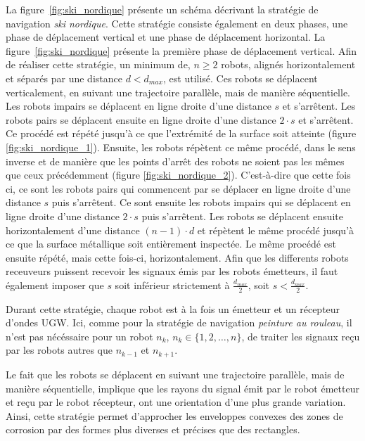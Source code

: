 \documentclass[francais,RandD]{rapportPFE}
\begin{document}
				La figure~\ref{fig:ski_nordique} présente un schéma décrivant la stratégie de navigation \textit{ski nordique}.
				Cette stratégie consiste également en deux phases, une phase de déplacement vertical et une phase de déplacement horizontal.
				La figure~\ref{fig:ski_nordique} présente la première phase de déplacement vertical.
				Afin de réaliser cette stratégie, un minimum de, $n \ge 2$ robots, alignés horizontalement et séparés par une distance $d < d_{max}$, est utilisé.
				Ces robots se déplacent verticalement, en suivant une trajectoire parallèle, mais de manière séquentielle.
				Les robots impairs se déplacent en ligne droite d'une distance $s$ et s'arrêtent.
				Les robots pairs se déplacent ensuite en ligne droite d'une distance $2 \cdot s$ et s'arrêtent.
				Ce procédé est répété jusqu'à ce que l'extrémité de la surface soit atteinte (figure \ref{fig:ski_nordique_1}).
				Ensuite, les robots répètent ce même procédé, dans le sens inverse et de manière que les points d'arrêt des robots ne soient pas les mêmes que ceux précédemment (figure \ref{fig:ski_nordique_2}).
				C'est-à-dire que cette fois ci, ce sont les robots pairs qui commencent par se déplacer en ligne droite d'une distance $s$ puis s'arrêtent.
				Ce sont ensuite les robots impairs qui se déplacent en ligne droite d'une distance $2 \cdot s$ puis s'arrêtent.
				Les robots se déplacent ensuite horizontalement d'une distance $(n - 1) \cdot d$ et répètent le même procédé jusqu'à ce que la surface métallique soit entièrement inspectée.
				Le même procédé est ensuite répété, mais cette fois-ci, horizontalement.
				Afin que les differents robots receuveurs puissent recevoir les signaux émis par les robots émetteurs, il faut également imposer que $s$ soit inférieur strictement à $\frac{d_{max}}{2}$, soit $s < \frac{d_{max}}{2}$.

				Durant cette stratégie, chaque robot est à la fois un émetteur et un récepteur d'ondes UGW.
				Ici, comme pour la stratégie de navigation \textit{peinture au rouleau}, il n'est pas nécéssaire pour un robot $n_k$, $n_k \in \{1, 2, \dots, n\}$, de traiter les signaux reçu par les robots autres que $n_{k-1}$ et $n_{k+1}$.

				Le fait que les robots se déplacent en suivant une trajectoire parallèle, mais de manière séquentielle, implique que les rayons du signal émit par le robot émetteur et reçu par le robot récepteur, ont une orientation d'une plus grande variation.
				Ainsi, cette stratégie permet d'approcher les enveloppes convexes des zones de corrosion par des formes plus diverses et précises que des rectangles.
\end{document}
